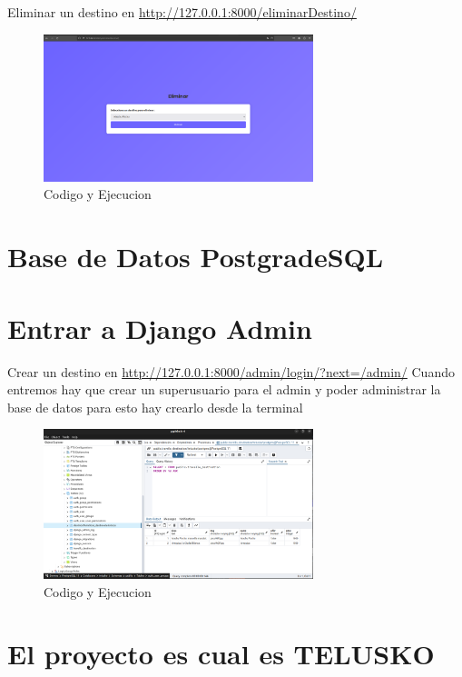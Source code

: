 \documentclass[10pt, a4paper]{article}
\begin{document}
\singlespacing
Eliminar un destino en \href{http://127.0.0.1:8000/eliminarDestino/}{http://127.0.0.1:8000/eliminarDestino/}

\begin{figure}[H]
  \centering
  \includegraphics[width=0.7\textwidth]{img/eliminar.png}
  \caption{Codigo y Ejecucion}
\end{figure}

\section{Base de Datos PostgradeSQL}

\section{Entrar a Django Admin}
Crear un destino en \href{http://127.0.0.1:8000/admin/login/?next=/admin/}{http://127.0.0.1:8000/admin/login/?next=/admin/}
\singlespacing
Cuando entremos hay que crear un superusuario para el admin y poder administrar la base de datos para esto hay crearlo desde la terminal

\begin{figure}[H]
  \centering
  \includegraphics[width=0.7\textwidth]{img/destinos-db.png}
  \caption{Codigo y Ejecucion}
\end{figure}

\section{El proyecto es cual es TELUSKO}
\end{document}
